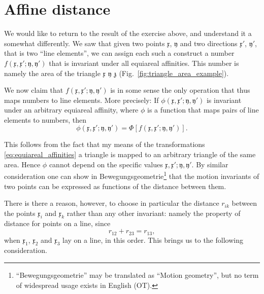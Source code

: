 \documentclass[11pt]{book} \usepackage{amssymb}
\newcommand{\myvec}[1]{\mathfrak{#1}}
\newcommand{\vecx}{\myvec{x}}
\newcommand{\vecy}{\myvec{y}}
\begin{document}
\section{Affine distance}

We would like to return to the result of the exercise above, and understand it
a somewhat differently. We saw that given two points $\vecx$, $\vecy$
and two directions $\vecx'$, $\vecy'$, that is two ``line elements'', 
we can assign each such a construct a number 
$f(\vecx,\vecx';\vecy,\vecy')$ that is invariant under all
equiareal affinities. This number is namely the area of the triangle 
$\vecx$ $\vecy$ $\myvec{z}$ (Fig.~\ref{fig:triangle_area_example}).

We now claim that $f(\vecx,\vecx';\vecy,\vecy')$ is in some
sense the only operation that thus maps numbers to line elements. More 
precisely: If $\phi(\vecx,\vecx';\vecy,\vecy')$ is invariant
under an arbitrary equiareal affinity, where $\phi$ is a function that maps
pairs of line elements to numbers, then
$$ \phi(\vecx,\vecx';\vecy,\vecy') = \Phi\left[f(\vecx,\vecx';\vecy,\vecy')\right].$$

This follows from the fact that my means of the transformations 
\eqref{eq:equiareal_affinities} a triangle is mapped to an arbitrary triangle
of the same area. Hence $\phi$ cannot depend on the specific values
$\vecx,\vecx';\vecy,\vecy'$. By similar consideration one can
show in Bewegungsgeometrie\footnote{``Bewegungsgeometrie'' may be 
translated as
``Motion geometry'', but no term of widespread usage exists in English (OT).} 
that the motion invariants of two points can be 
expressed as functions of the distance between them.

There is there a reason, however, to choose in particular the distance $r_{ik}$
between the points $\vecx_i$ and $\vecx_k$ rather than any other
invariant: namely the property of distance for points on a line, since
$$r_{12}+r_{23}=r_{13},$$
when $\vecx_1$,  $\vecx_2$ and $\vecx_3$ lay on a line, in this 
order. This brings us to the following consideration.
 
\end{document}
